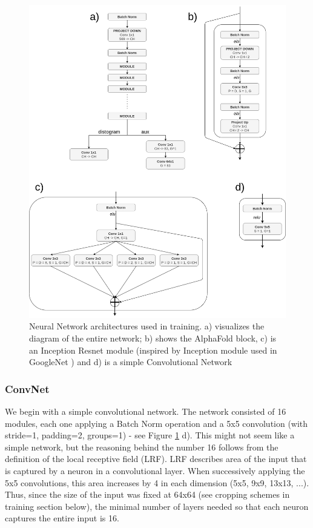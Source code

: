 \begin{figure}
    \centering
    \includegraphics[width=\linewidth]{imgs_tomas/Architectures.png}
    \caption{Neural Network architectures used in training. a) visualizes the diagram of the entire network; b) shows the AlphaFold block, c) is an Inception Resnet module (inspired by Inception module used in GoogleNet \cite{googlenet}) and d) is a simple Convolutional Network}
    \label{fig:architectures}
\end{figure}

\subsubsection{ConvNet}

We begin with a simple convolutional network. The network consisted of 16 modules, each one applying a Batch Norm operation and a 5x5 convolution (with stride=1, padding=2, groups=1) - see Figure \ref{fig:architectures} d). This might not seem like a simple network, but the reasoning behind the number 16 follows from the definition of the local receptive field (LRF). LRF describes area of the input that is captured by a neuron in a convolutional layer. When successively applying the 5x5 convolutions, this area increases by 4 in each dimension (5x5, 9x9, 13x13, ...). Thus, since the size of the input was fixed at 64x64 (see cropping schemes in training section below), the minimal number of layers needed so that each neuron captures the entire input is 16.

